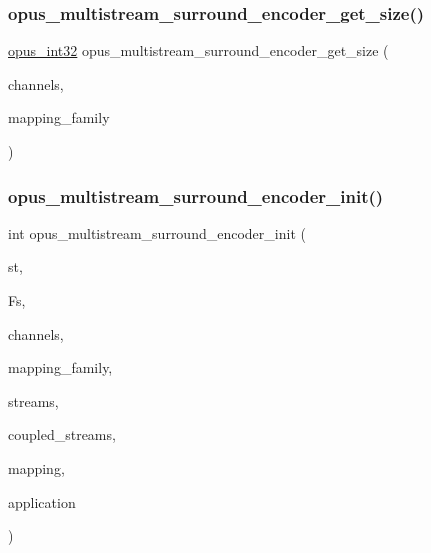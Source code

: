 \subsubsection{\texorpdfstring{opus\+\_\+multistream\+\_\+surround\+\_\+encoder\+\_\+get\+\_\+size()}{opus\_multistream\_surround\_encoder\_get\_size()}}
{\footnotesize\ttfamily \hyperlink{opus__types_8h_aa4d309d6f80b99dbabebc8f98879ab9a}{opus\+\_\+int32} opus\+\_\+multistream\+\_\+surround\+\_\+encoder\+\_\+get\+\_\+size (\begin{DoxyParamCaption}\item[{int}]{channels,  }\item[{int}]{mapping\+\_\+family }\end{DoxyParamCaption})}

\mbox{\label{group__opus__multistream_ga993bfbae18b2dbfd641e50e51cef4484}} 
\subsubsection{\texorpdfstring{opus\+\_\+multistream\+\_\+surround\+\_\+encoder\+\_\+init()}{opus\_multistream\_surround\_encoder\_init()}}
{\footnotesize\ttfamily int opus\+\_\+multistream\+\_\+surround\+\_\+encoder\+\_\+init (\begin{DoxyParamCaption}\item[{\hyperlink{group__opus__multistream_gae5826674d142fc873ebc1d781c507dd7}{Opus\+M\+S\+Encoder} $\ast$}]{st,  }\item[{\hyperlink{opus__types_8h_aa4d309d6f80b99dbabebc8f98879ab9a}{opus\+\_\+int32}}]{Fs,  }\item[{int}]{channels,  }\item[{int}]{mapping\+\_\+family,  }\item[{int $\ast$}]{streams,  }\item[{int $\ast$}]{coupled\+\_\+streams,  }\item[{unsigned char $\ast$}]{mapping,  }\item[{int}]{application }\end{DoxyParamCaption})}

